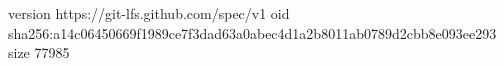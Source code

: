 version https://git-lfs.github.com/spec/v1
oid sha256:a14c06450669f1989ce7f3dad63a0abec4d1a2b8011ab0789d2cbb8e093ee293
size 77985
